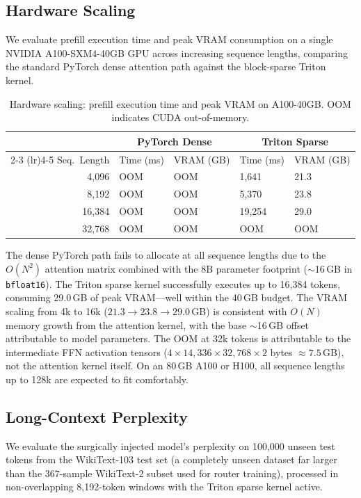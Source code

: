 \documentclass[11pt,a4paper]{article}
\begin{document}
\subsection{Hardware Scaling}

We evaluate prefill execution time and peak VRAM consumption on a single NVIDIA A100-SXM4-40GB GPU across increasing sequence lengths, comparing the standard PyTorch dense attention path against the block-sparse Triton kernel.

\begin{table}[h]
\centering
\caption{Hardware scaling: prefill execution time and peak VRAM on A100-40GB. OOM indicates CUDA out-of-memory.}
\label{tab:hardware}
\begin{tabular}{@{}rllll@{}}
\toprule
& \multicolumn{2}{c}{PyTorch Dense} & \multicolumn{2}{c}{Triton Sparse} \\
\cmidrule(lr){2-3} \cmidrule(lr){4-5}
Seq.\ Length & Time (ms) & VRAM (GB) & Time (ms) & VRAM (GB) \\
\midrule
4{,}096   & OOM & OOM & 1{,}641 & 21.3 \\
8{,}192   & OOM & OOM & 5{,}370 & 23.8 \\
16{,}384  & OOM & OOM & 19{,}254 & 29.0 \\
32{,}768  & OOM & OOM & OOM & OOM \\
\bottomrule
\end{tabular}
\end{table}

The dense PyTorch path fails to allocate at all sequence lengths due to the $O(N^2)$ attention matrix combined with the 8B parameter footprint ($\sim$16\,GB in \texttt{bfloat16}). The Triton sparse kernel successfully executes up to 16{,}384 tokens, consuming 29.0\,GB of peak VRAM---well within the 40\,GB budget. The VRAM scaling from 4k to 16k ($21.3 \to 23.8 \to 29.0$\,GB) is consistent with $O(N)$ memory growth from the attention kernel, with the base $\sim$16\,GB offset attributable to model parameters. The OOM at 32k tokens is attributable to the intermediate FFN activation tensors ($4 \times 14{,}336 \times 32{,}768 \times 2$ bytes $\approx 7.5$\,GB), not the attention kernel itself. On an 80\,GB A100 or H100, all sequence lengths up to 128k are expected to fit comfortably.

\subsection{Long-Context Perplexity}

We evaluate the surgically injected model's perplexity on 100,000 unseen test tokens from the WikiText-103 test set \citep{merity2016pointer} (a completely unseen dataset far larger than the 367-sample WikiText-2 subset used for router training), processed in non-overlapping 8,192-token windows with the Triton sparse kernel active.
\end{document}
